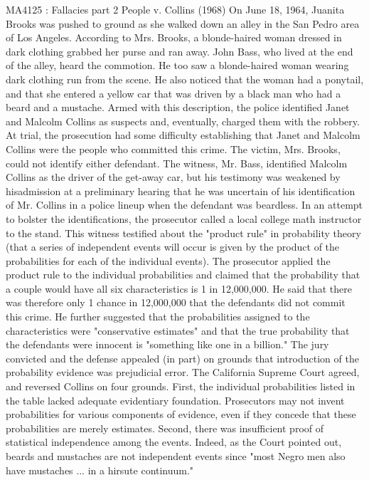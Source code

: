 MA4125 : Fallacies part 2
People v. Collins (1968)
On June 18, 1964, Juanita Brooks was pushed to ground as she walked down an alley in the
San Pedro area of Los Angeles. According to Mrs. Brooks, a blonde-haired woman dressed in
dark clothing grabbed her purse and ran away. John Bass, who lived at the end of the alley,
heard the commotion. He too saw a blonde-haired woman wearing dark clothing run from the
scene. He also noticed that the woman had a ponytail, and that she entered a yellow car
that was driven by a black man who had a beard and a mustache.
Armed with this description, the police identified Janet and Malcolm Collins as suspects
and, eventually, charged them with the robbery. At trial, the prosecution had some difficulty
establishing that Janet and Malcolm Collins were the people who committed this crime.
The victim, Mrs. Brooks, could not identify either defendant. The witness, Mr. Bass,
identified Malcolm Collins as the driver of the get-away car, but his testimony was
weakened by hisadmission at a preliminary hearing that he was uncertain of his identification
of Mr. Collins in a police lineup when the defendant was beardless.
In an attempt to bolster the identifications, the prosecutor called a local college math
instructor to the stand. This witness testified about the "product rule" in probability
theory (that a series of independent events will
occur is given by the product of the probabilities for each of the individual events).
The prosecutor applied the product rule to the individual probabilities and claimed
that the probability that a couple would have all six characteristics is 1 in 12,000,000.
He said that there was therefore only 1 chance in 12,000,000 that the defendants did not
commit this crime. He further suggested that the probabilities assigned to the
characteristics were "conservative estimates" and that the true
probability that the defendants were innocent is "something like one in a billion."
The jury convicted and the defense appealed (in part) on grounds that introduction of the
probability evidence was prejudicial error. The California Supreme Court agreed,
and reversed Collins on four grounds. First, the individual probabilities listed in the
table lacked adequate evidentiary foundation. Prosecutors may not invent probabilities for
various components of evidence, even if they concede that these probabilities are merely
estimates. Second, there was insufficient proof of statistical independence among the events.
Indeed, as the Court pointed out, beards and mustaches are not independent events
since "most Negro men also have mustaches ... in a hirsute continuum."
